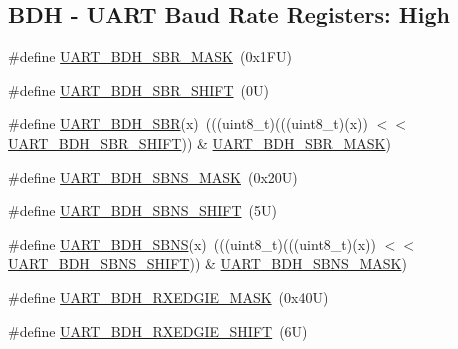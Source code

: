 \subsection*{B\+DH -\/ U\+A\+RT Baud Rate Registers\+: High}
\begin{DoxyCompactItemize}
\item 
\#define \mbox{\hyperlink{group___u_a_r_t___register___masks_ga2680dc8176b0c933b4a1b77c5dbb64b7}{U\+A\+R\+T\+\_\+\+B\+D\+H\+\_\+\+S\+B\+R\+\_\+\+M\+A\+SK}}~(0x1\+F\+U)
\item 
\#define \mbox{\hyperlink{group___u_a_r_t___register___masks_gac38d8a98be282d97c4837597a6c02cda}{U\+A\+R\+T\+\_\+\+B\+D\+H\+\_\+\+S\+B\+R\+\_\+\+S\+H\+I\+FT}}~(0\+U)
\item 
\#define \mbox{\hyperlink{group___u_a_r_t___register___masks_ga7d337242135cdbd812b7da47758fbdb6}{U\+A\+R\+T\+\_\+\+B\+D\+H\+\_\+\+S\+BR}}(x)~(((uint8\+\_\+t)(((uint8\+\_\+t)(x)) $<$$<$ \mbox{\hyperlink{group___u_a_r_t___register___masks_gac38d8a98be282d97c4837597a6c02cda}{U\+A\+R\+T\+\_\+\+B\+D\+H\+\_\+\+S\+B\+R\+\_\+\+S\+H\+I\+FT}})) \& \mbox{\hyperlink{group___u_a_r_t___register___masks_ga2680dc8176b0c933b4a1b77c5dbb64b7}{U\+A\+R\+T\+\_\+\+B\+D\+H\+\_\+\+S\+B\+R\+\_\+\+M\+A\+SK}})
\item 
\#define \mbox{\hyperlink{group___u_a_r_t___register___masks_ga727c0ef3199f627c85fc740265d5134d}{U\+A\+R\+T\+\_\+\+B\+D\+H\+\_\+\+S\+B\+N\+S\+\_\+\+M\+A\+SK}}~(0x20\+U)
\item 
\#define \mbox{\hyperlink{group___u_a_r_t___register___masks_ga4d6023b67150b98ef12dba445f773109}{U\+A\+R\+T\+\_\+\+B\+D\+H\+\_\+\+S\+B\+N\+S\+\_\+\+S\+H\+I\+FT}}~(5\+U)
\item 
\#define \mbox{\hyperlink{group___u_a_r_t___register___masks_gad98a9d2c20f141d5cb02b1afb5cef1c5}{U\+A\+R\+T\+\_\+\+B\+D\+H\+\_\+\+S\+B\+NS}}(x)~(((uint8\+\_\+t)(((uint8\+\_\+t)(x)) $<$$<$ \mbox{\hyperlink{group___u_a_r_t___register___masks_ga4d6023b67150b98ef12dba445f773109}{U\+A\+R\+T\+\_\+\+B\+D\+H\+\_\+\+S\+B\+N\+S\+\_\+\+S\+H\+I\+FT}})) \& \mbox{\hyperlink{group___u_a_r_t___register___masks_ga727c0ef3199f627c85fc740265d5134d}{U\+A\+R\+T\+\_\+\+B\+D\+H\+\_\+\+S\+B\+N\+S\+\_\+\+M\+A\+SK}})
\item 
\#define \mbox{\hyperlink{group___u_a_r_t___register___masks_ga0882debd8f2c52d4ab8461b22b6519d9}{U\+A\+R\+T\+\_\+\+B\+D\+H\+\_\+\+R\+X\+E\+D\+G\+I\+E\+\_\+\+M\+A\+SK}}~(0x40\+U)
\item 
\#define \mbox{\hyperlink{group___u_a_r_t___register___masks_ga97c5d15ae3144492e364744236aa10f7}{U\+A\+R\+T\+\_\+\+B\+D\+H\+\_\+\+R\+X\+E\+D\+G\+I\+E\+\_\+\+S\+H\+I\+FT}}~(6\+U)

\end{DoxyCompactItemize}
